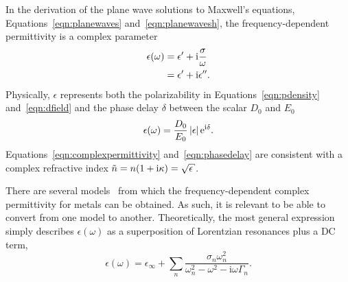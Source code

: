 In the derivation of the plane wave solutions to Maxwell's equations,
Equations~\ref{eqn:planewaves} and~\ref{eqn:planewavesh}, the
frequency-dependent permittivity is a complex parameter
\begin{align}
 \epsilon(\omega) &= \epsilon^\prime + {\mathrm{i}} \frac{\sigma}{\omega}\\
                   &= \epsilon^\prime + {\mathrm{i}}\epsilon^{\prime\prime}.
																			\label{eqn:complexpermittivity}
\end{align}
Physically, $\epsilon$ represents both the polarizability in
Equations~\ref{eqn:pdensity} and~\ref{eqn:dfield} and the phase delay
$\delta$ between the scalar $D_0$ and
$E_0$
\begin{equation}
 \epsilon(\omega) = \frac{D_0}{E_0} \,|\epsilon| \,{\mathrm{e}}^{{\mathrm{i}} \delta}.
	\label{eqn:phasedelay}
\end{equation}
Equations~\ref{eqn:complexpermittivity} and~\ref{eqn:phasedelay} are
consistent with a complex refractive index $\tilde{n} = n(1+\mi \kappa) =
\sqrt{\epsilon}$.

There are several models~\cite{rakic1998optical} from which
the frequency-dependent complex permittivity for metals can be obtained.
As such, it is relevant to be able to convert from one model to another.
Theoretically, the most general expression simply describes
$\epsilon(\omega)$ as a superposition of Lorentzian resonances plus a DC
term,
\begin{equation}
\epsilon(\omega)= \epsilon_\infty+\sum_n \frac{\sigma_n \omega_n^2} {\omega_n^2-\omega^2-{\mathrm{i}}\omega\Gamma_n}.
\label{eqn:meepdispersion}
\end{equation}

